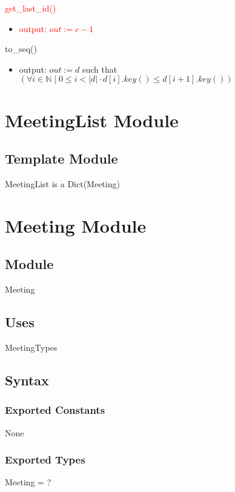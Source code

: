 \documentclass[12pt, titlepage]{article}
\begin{document}
\noindent\textcolor{red}{get\_last\_id()}
\begin{itemize}
    \item \textcolor{red}{output: $out := c - 1$}
\end{itemize}

\noindent to\_seq()
\begin{itemize}
    \item output: $out := d$ such that $(\forall i \in \mathbb{N} \mid 0 \leq i < |d| \cdot d[i].key() \leq d[i + 1].key())$
\end{itemize}

\newpage
\section* {MeetingList Module}

\subsection*{Template Module}
MeetingList is a Dict(Meeting)

\newpage

\section* {Meeting Module}

\subsection*{Module}
Meeting

\subsection* {Uses}
MeetingTypes

\subsection* {Syntax}
\subsubsection* {Exported Constants}
None

\subsubsection* {Exported Types}
Meeting = ?
\end{document}
